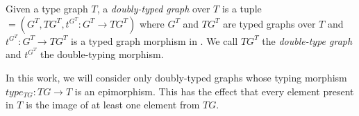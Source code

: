 \begin{definition} Given a type graph $T$, a \emph{doubly-typed graph} \doublyTypedGraph{} over $T$ is a tuple \doublyTypedGraph $= \left(G^T,TG^T, t^{G^T} : G^T \rightarrow TG^T\right)$ where $G^T$ and $TG^T$ are typed graphs over $T$ and \mbox{$t^{G^T} : G^T \rightarrow TG^T$} is a typed graph morphism in \typedGraphCategory{}. We call $TG^T$ the \emph{double-type graph} and $t^{G^T}$ the double-typing morphism.
\end{definition}

\begin{remark} In this work, we will consider only doubly-typed graphs whose typing morphism $type_{TG} : TG \rightarrow T$ is an epimorphism. This has the effect that every element present in $T$ is the image of at least one element from $TG$.
\end{remark}

